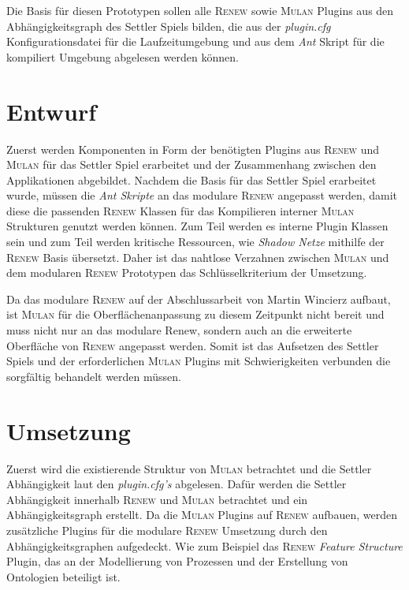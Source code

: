 	Die Basis für diesen Prototypen sollen alle \textsc{Renew} sowie \textsc{Mulan} Plugins aus den Abhängigkeitsgraph des Settler Spiels bilden, die aus der \textit{plugin.cfg} Konfigurationsdatei für die Laufzeitumgebung und aus dem \textit{Ant} Skript für die kompiliert Umgebung abgelesen werden können. 


\section{Entwurf}
	Zuerst werden Komponenten in Form der benötigten Plugins aus \textsc{Renew} und \textsc{Mulan} für das Settler Spiel erarbeitet und der Zusammenhang zwischen den Applikationen abgebildet.\bigbreak
	Nachdem die Basis für das Settler Spiel erarbeitet wurde, müssen die \textit{Ant Skripte} an das modulare \textsc{Renew} angepasst werden, damit diese die passenden \textsc{Renew} Klassen für das Kompilieren interner \textsc{Mulan} Strukturen genutzt werden können. Zum Teil werden es interne Plugin Klassen sein und zum Teil werden kritische Ressourcen, wie \textit{Shadow Netze} mithilfe der \textsc{Renew} Basis übersetzt. Daher ist das nahtlose Verzahnen zwischen \textsc{Mulan} und dem modularen \textsc{Renew} Prototypen das Schlüsselkriterium der Umsetzung. \bigbreak
	
	Da das modulare \textsc{Renew} auf der Abschlussarbeit von Martin Wincierz \cite{Wincierz18} aufbaut, ist \textsc{Mulan} für die Oberflächenanpassung zu diesem Zeitpunkt nicht bereit und muss nicht nur an das modulare Renew, sondern auch an die erweiterte Oberfläche von \textsc{Renew} angepasst werden.\newline
	Somit ist das Aufsetzen des Settler Spiels und der erforderlichen \textsc{Mulan} Plugins mit Schwierigkeiten verbunden die sorgfältig behandelt werden müssen. 

\section{Umsetzung}
	Zuerst wird die existierende Struktur von \textsc{Mulan} betrachtet und die Settler Abhängigkeit laut den \textit{plugin.cfg's} abgelesen. Dafür werden die Settler Abhängigkeit innerhalb \textsc{Renew} und \textsc{Mulan} betrachtet und ein Abhängigkeitsgraph erstellt. Da die \textsc{Mulan} Plugins auf \textsc{Renew} aufbauen, werden zusätzliche Plugins für die modulare \textsc{Renew} Umsetzung durch den Abhängigkeitsgraphen aufgedeckt. Wie zum Beispiel das \textsc{Renew} \textit{Feature Structure} Plugin, das an der Modellierung von Prozessen und der Erstellung von Ontologien beteiligt ist. \bigbreak

